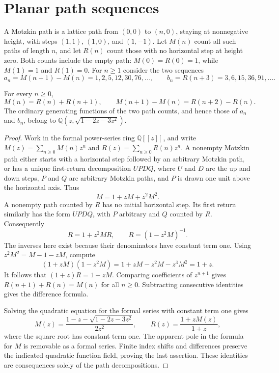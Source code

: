 \section{Planar path sequences}

A Motzkin path is a lattice path from $(0,0)$ to $(n,0)$, staying at
nonnegative height, with steps $(1,1)$, $(1,0)$, and $(1,-1)$.
Let $M(n)$ count all such paths of length $n$, and let $R(n)$ count those with
no horizontal step at height zero.  Both counts include the empty path:
$M(0)=R(0)=1$, while $M(1)=1$ and $R(1)=0$.
For $n\ge1$ consider the two sequences
\[
 a_n=M(n+1)-M(n)=1,2,5,12,30,76,\ldots,
 \qquad
 b_n=R(n+3)=3,6,15,36,91,\ldots.
\]

\begin{proposition}
\label{prop:one-sequence-spine}
For every $n\ge0$,
\[
 M(n)=R(n)+R(n+1),\qquad
 M(n+1)-M(n)=R(n+2)-R(n).
\]
The ordinary generating functions of the two path counts, and hence those
of $a_n$ and $b_n$, belong to
$\mathbb Q(z,\sqrt{1-2z-3z^2})$.
\end{proposition}
\begin{proof}
Work in the formal power-series ring $\mathbb Q[[z]]$, and write
$M(z)=\sum_{n\ge0}M(n)z^n$ and $R(z)=\sum_{n\ge0}R(n)z^n$.
A nonempty Motzkin path either starts with a horizontal step followed by
an arbitrary Motzkin path, or has a unique first-return decomposition
$U P D Q$, where $U$ and $D$ are the up and down steps,
$P$ and $Q$ are arbitrary Motzkin paths, and $P$ is drawn
one unit above the horizontal axis.  Thus
\[
 M=1+zM+z^2M^2.
\]
A nonempty path counted by $R$ has no initial horizontal step.  Its first
return similarly has the form $U P D Q$, with $P$ arbitrary and $Q$ counted
by $R$.  Consequently
\[
 R=1+z^2MR,\qquad R=(1-z^2M)^{-1}.
\]
The inverses here exist because their denominators have constant term one.
Using $z^2M^2=M-1-zM$, compute
\[
 (1+zM)(1-z^2M)
 =1+zM-z^2M-z^3M^2=1+z.
\]
It follows that $(1+z)R=1+zM$.  Comparing coefficients of $z^{n+1}$ gives
$R(n+1)+R(n)=M(n)$ for all $n\ge0$.  Subtracting consecutive identities
gives the difference formula.

Solving the quadratic equation for the formal series with constant term
one gives
\[
 M(z)=\frac{1-z-\sqrt{1-2z-3z^2}}{2z^2},\qquad
 R(z)=\frac{1+zM(z)}{1+z},
\]
where the square root has constant term one.  The apparent pole in the
formula for $M$ is removable as a formal series.  Finite index shifts and
differences preserve the indicated quadratic function field, proving the
last assertion.  These identities are consequences solely of the path
decompositions.
\end{proof}

